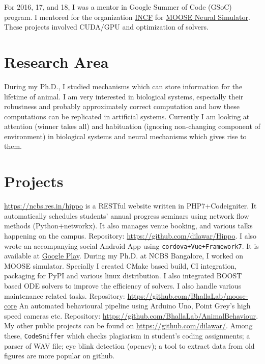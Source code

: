 \documentclass[11pt,a4paper, colorlinks=true, linkcolor=cyan]{moderncv}
\begin{document}
{}{}{For 2016, 17, and 18, I was a mentor in Google Summer of Code (GSoC)
    program. I mentored for the organization \href{https://incf.org}{INCF} for
    \href{https://moose.ncbs.res.in}{MOOSE Neural Simulator}. These projects
    involved CUDA/GPU and optimization of solvers.
}

\section{Research Area}
{}{}{}
{
    During my Ph.D., I studied mechanisms which can store information for the lifetime
    of animal. I am very interested in biological systems, especially their
    robustness and probably approximately correct computation and how these
    computations can be replicated in artificial systems.
    Currently I am looking at attention (winner takes all) and habituation (ignoring non-changing
    component of environment) in biological systems and neural mechanisms which
    gives rise to them.
}

\section{Projects}
{}{}{}
{
    \href{NCBS Hippo}{https://ncbs.res.in/hippo} is a RESTful
    website written in PHP7+Codeigniter. It automatically schedules students'
    annual progress seminars using network flow methods (Python+networkx). It also
    manages venue booking, and various talks happening on the campus. 
    Repository: \url{https://github.com/dilawar/Hippo}.
    I also wrote an accompanying social Android App using
    \texttt{cordova+Vue+Framework7}. It is available at
    \href{https://play.google.com/store/apps/details?id=com.dilawar.hippo}{Google Play}.
}
{}{}{}
{
    During my Ph.D. at NCBS Bangalore, I worked on MOOSE simulator. Specially I
    created CMake based build, CI integration, packaging for PyPI and various
    linux distribution. I also integrated BOOST based ODE solvers to improve the
    efficiency of solvers. I also handle various maintenance related tasks. 
    Repository: \url{https://github.com/BhallaLab/moose-core}
}
{}{}{}
{
    An automated behavioural pipeline using Arduino Uno, Point Grey's high speed
    cameras etc.  
    Repository: \url{https://github.com/BhallaLab/AnimalBehaviour}.
}
{}{}{}
{
    My other public projects can be found on \url{https://github.com/dilawar/}.
    Among these, \texttt{CodeSniffer} which checks plagiarism in student's coding
    assignments; a parser of WAV file; eye blink detection (opencv); a tool to
    extract data from old figures are more popular on github.
}
\end{document}
